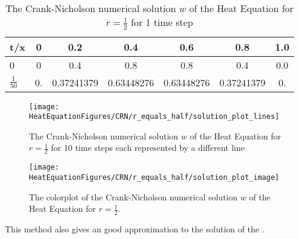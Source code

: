 \begin{example}
\begin{center}
\begin{table}[H]
 \caption{The Crank-Nicholson numerical solution $w$ of the Heat Equation for $r=\frac{1}{2}$ for 1 time step}
 \centering
\begin{tabular}{l|cccccc}
t/x&0&0.2&0.4&0.6&0.8&1.0\\ \hline
0&0&0.4&0.8&0.8&0.4&0.0\\
$\frac{1}{50}$&0.    &      0.37241379  & 0.63448276 & 0.63448276  & 0.37241379 & 0.
\end{tabular}
\end{table}
\end{center}

\begin{figure}[H]
  \caption{The Crank-Nicholson numerical solution $w$ of the Heat Equation for $r=\frac{1}{2}$ for 10 time steps each represented by a different line}
  \centering
    \texttt{[image: HeatEquationFigures/CRN/r\_equals\_half/solution\_plot\_lines]}
\end{figure}


\begin{figure}[H]
  \caption{The colorplot of the Crank-Nicholson numerical solution $w$ of the Heat Equation for $r=\frac{1}{2}$.}
  \centering
    \texttt{[image: HeatEquationFigures/CRN/r\_equals\_half/solution\_plot\_image]}
\end{figure}


This method also gives an good approximation to the solution of the .
\end{example}
